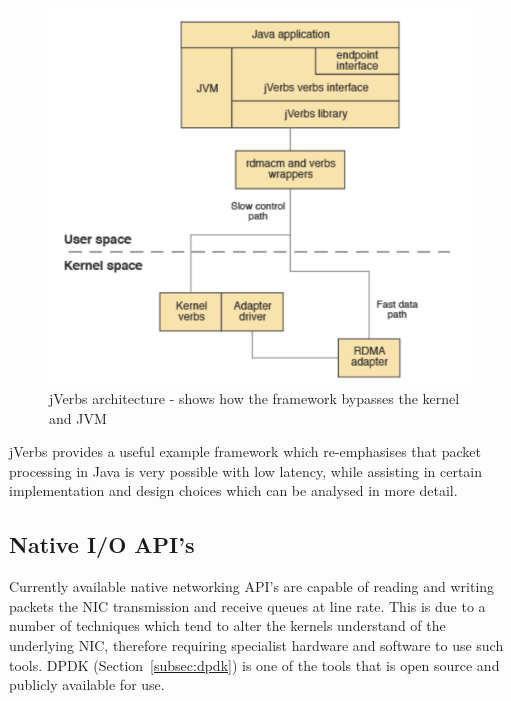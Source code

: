 \documentclass[interim_report.tex]{subfiles}
\begin{document}
\begin{figure}[H]
	\centering
	\includegraphics[width=\textwidth]{img/jverbs.png}
	\caption{jVerbs architecture - shows how the framework bypasses the kernel and JVM \cite{ibm_jverbs}}
	\label{fig:jverb}
\end{figure}

jVerbs provides a useful example framework which re-emphasises that packet processing in Java is very possible with low latency, while assisting in certain implementation and design choices which can be analysed in more detail. 

\subsection{Native I/O API's}
Currently available native networking API's are capable of reading and writing packets the NIC transmission and receive queues at line rate. This is due to a number of techniques which tend to alter the kernels understand of the underlying NIC, therefore requiring specialist hardware and software to use such tools. DPDK (Section~\ref{subsec:dpdk}) is one of the tools that is open source and publicly available for use.
\end{document}

